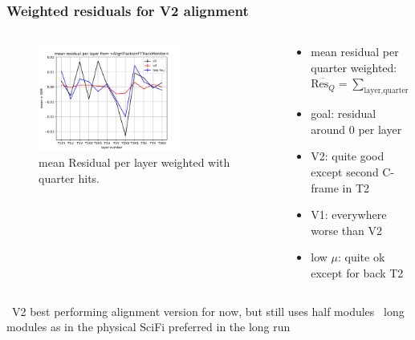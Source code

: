 \documentclass[aspectratio=1610, 12pt]{beamer}
\begin{document}
\begin{frame}\frametitle{Weighted residuals for V2 alignment}
    \begin{columns}
      \begin{column}[c]{0.48\textwidth}
        \begin{figure}
          \centering
          \includegraphics[width=0.7\textwidth]{2023-mar-9-DPG/meanResidual_AlignTracks_weighted.pdf}
          \caption{mean Residual per layer weighted with quarter hits.}
        \end{figure}
      \end{column}
      \begin{column}{0.48\textwidth}
        \begin{itemize}
          \item mean residual per quarter weighted: $
              \overline{\text{Res}_{Q}} = \sum_{\text{layer}, \text{quarter}} \frac{\text{hits quarter of layer}}{\text{hits layer}}$
          \item goal: residual around 0 per layer
          \item V2: quite good except second C-frame in T2
          \item V1: everywhere worse than V2
          \item low $\mu$: quite ok except for back T2
        \end{itemize}
      \end{column}
    \end{columns}
  \to\, V2 best performing alignment version for now, but still uses half modules
  \to\, long modules as in the physical SciFi preferred in the long run
\end{frame}
\end{document}
